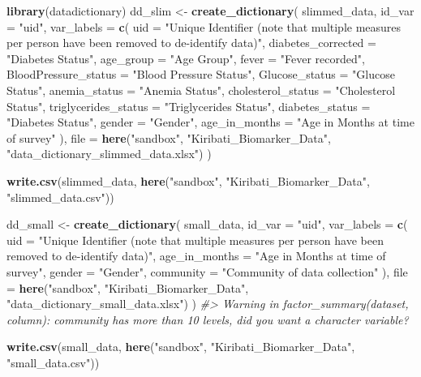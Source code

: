 \documentclass[]{article}
\newenvironment{Shaded}{\begin{snugshade}}{\end{snugshade}}
\newcommand{\CommentTok}[1]{\textcolor[rgb]{0.56,0.35,0.01}{\textit{#1}}}
\newcommand{\DataTypeTok}[1]{\textcolor[rgb]{0.13,0.29,0.53}{#1}}
\newcommand{\KeywordTok}[1]{\textcolor[rgb]{0.13,0.29,0.53}{\textbf{#1}}}
\newcommand{\NormalTok}[1]{#1}
\newcommand{\StringTok}[1]{\textcolor[rgb]{0.31,0.60,0.02}{#1}}
\begin{document}
\begin{Shaded}
\begin{Highlighting}[]
\KeywordTok{library}\NormalTok{(datadictionary)}
\NormalTok{dd_slim <-}\StringTok{ }\KeywordTok{create_dictionary}\NormalTok{(}
\NormalTok{  slimmed_data,}
  \DataTypeTok{id_var =} \StringTok{"uid"}\NormalTok{,}
  \DataTypeTok{var_labels =} \KeywordTok{c}\NormalTok{(}
    \DataTypeTok{uid =} \StringTok{"Unique Identifier (note that multiple measures per person have been removed to de-identify data)"}\NormalTok{,}
    \DataTypeTok{diabetes_corrected =} \StringTok{"Diabetes Status"}\NormalTok{,}
    \DataTypeTok{age_group =} \StringTok{"Age Group"}\NormalTok{,}
    \DataTypeTok{fever =} \StringTok{"Fever recorded"}\NormalTok{,}
    \DataTypeTok{BloodPressure_status =} \StringTok{"Blood Pressure Status"}\NormalTok{,}
    \DataTypeTok{Glucose_status =} \StringTok{"Glucose Status"}\NormalTok{,}
    \DataTypeTok{anemia_status =} \StringTok{"Anemia Status"}\NormalTok{,}
    \DataTypeTok{cholesterol_status =} \StringTok{"Cholesterol Status"}\NormalTok{,}
    \DataTypeTok{triglycerides_status =} \StringTok{"Triglycerides Status"}\NormalTok{,}
    \DataTypeTok{diabetes_status =} \StringTok{"Diabetes Status"}\NormalTok{,}
    \DataTypeTok{gender =} \StringTok{"Gender"}\NormalTok{,}
    \DataTypeTok{age_in_months =} \StringTok{"Age in Months at time of survey"}
\NormalTok{  ),}
  \DataTypeTok{file =} \KeywordTok{here}\NormalTok{(}\StringTok{"sandbox"}\NormalTok{, }\StringTok{"Kiribati_Biomarker_Data"}\NormalTok{, }\StringTok{"data_dictionary_slimmed_data.xlsx"}\NormalTok{)}
\NormalTok{)}

\KeywordTok{write.csv}\NormalTok{(slimmed_data, }\KeywordTok{here}\NormalTok{(}\StringTok{"sandbox"}\NormalTok{, }\StringTok{"Kiribati_Biomarker_Data"}\NormalTok{, }\StringTok{"slimmed_data.csv"}\NormalTok{))}

\NormalTok{dd_small <-}\StringTok{ }\KeywordTok{create_dictionary}\NormalTok{(}
\NormalTok{  small_data,}
  \DataTypeTok{id_var =} \StringTok{"uid"}\NormalTok{,}
  \DataTypeTok{var_labels =} \KeywordTok{c}\NormalTok{(}
    \DataTypeTok{uid =} \StringTok{"Unique Identifier (note that multiple measures per person have been removed to de-identify data)"}\NormalTok{,}
    \DataTypeTok{age_in_months =} \StringTok{"Age in Months at time of survey"}\NormalTok{,}
    \DataTypeTok{gender =} \StringTok{"Gender"}\NormalTok{,}
    \DataTypeTok{community =} \StringTok{"Community of data collection"}
\NormalTok{  ),}
  \DataTypeTok{file =} \KeywordTok{here}\NormalTok{(}\StringTok{"sandbox"}\NormalTok{, }\StringTok{"Kiribati_Biomarker_Data"}\NormalTok{, }\StringTok{"data_dictionary_small_data.xlsx"}\NormalTok{)}
\NormalTok{)}
\CommentTok{#> Warning in factor_summary(dataset, column): community has more than 10 levels, did you want a character variable?}

\KeywordTok{write.csv}\NormalTok{(small_data, }\KeywordTok{here}\NormalTok{(}\StringTok{"sandbox"}\NormalTok{, }\StringTok{"Kiribati_Biomarker_Data"}\NormalTok{, }\StringTok{"small_data.csv"}\NormalTok{))}
\end{Highlighting}
\end{Shaded}
\end{document}
